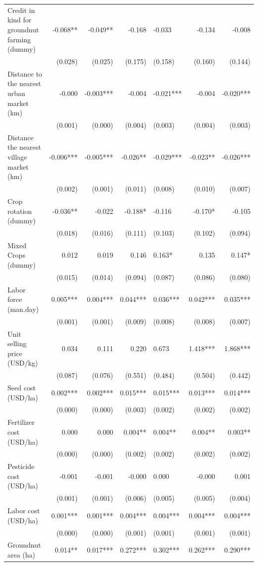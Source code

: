 \documentclass[
]{article}
\begin{document}
\begin{landscape}
\begin{longtable}[t]{lrrrlrr}
Credit in kind for groundnut farming (dummy) & -0.068** & -0.049** & -0.168 & -0.033 & -0.134 & -0.008\\
 & (0.028) & (0.025) & (0.175) & (0.158) & (0.160) & (0.144)\\
Distance to the nearest urban market (km) & -0.000 & -0.003*** & -0.004 & -0.021*** & -0.004 & -0.020***\\
 & (0.001) & (0.000) & (0.004) & (0.003) & (0.004) & (0.003)\\
Distance the nearest village market (km) & -0.006*** & -0.005*** & -0.026** & -0.029*** & -0.023** & -0.026***\\
 & (0.002) & (0.001) & (0.011) & (0.008) & (0.010) & (0.007)\\
Crop rotation (dummy) & -0.036** & -0.022 & -0.188* & -0.116 & -0.170* & -0.105\\
 & (0.018) & (0.016) & (0.111) & (0.103) & (0.102) & (0.094)\\
Mixed Crops (dummy) & 0.012 & 0.019 & 0.146 & 0.163* & 0.135 & 0.147*\\
 & (0.015) & (0.014) & (0.094) & (0.087) & (0.086) & (0.080)\\
Labor force (man.day) & 0.005*** & 0.004*** & 0.044*** & 0.036*** & 0.042*** & 0.035***\\
 & (0.001) & (0.001) & (0.009) & (0.008) & (0.008) & (0.007)\\
Unit selling price (USD/kg) & 0.034 & 0.111 & 0.220 & 0.673 & 1.418*** & 1.868***\\
 & (0.087) & (0.076) & (0.551) & (0.484) & (0.504) & (0.442)\\
Seed cost (USD/ha) & 0.002*** & 0.002*** & 0.015*** & 0.015*** & 0.013*** & 0.014***\\
 & (0.000) & (0.000) & (0.003) & (0.002) & (0.002) & (0.002)\\
Fertilizer cost (USD/ha) & 0.000 & 0.000 & 0.004** & 0.004** & 0.004** & 0.003**\\
 & (0.000) & (0.000) & (0.002) & (0.002) & (0.002) & (0.002)\\
Pesticide cost (USD/ha) & -0.001 & -0.001 & -0.000 & 0.000 & -0.000 & 0.001\\
 & (0.001) & (0.001) & (0.006) & (0.005) & (0.005) & (0.004)\\
Labor cost (USD/ha) & 0.001*** & 0.001*** & 0.004*** & 0.004*** & 0.004*** & 0.004***\\
 & (0.000) & (0.000) & (0.001) & (0.001) & (0.001) & (0.001)\\
Groundnut area (ha) & 0.014** & 0.017*** & 0.272*** & 0.302*** & 0.262*** & 0.290***\\

\end{longtable}
\end{landscape}
\end{document}
